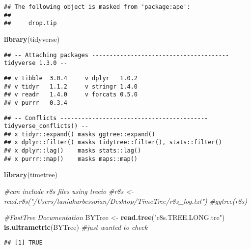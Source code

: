 \documentclass[
]{article}
\newenvironment{Shaded}{\begin{snugshade}}{\end{snugshade}}
\newcommand{\CommentTok}[1]{\textcolor[rgb]{0.56,0.35,0.01}{\textit{#1}}}
\newcommand{\KeywordTok}[1]{\textcolor[rgb]{0.13,0.29,0.53}{\textbf{#1}}}
\newcommand{\NormalTok}[1]{#1}
\newcommand{\StringTok}[1]{\textcolor[rgb]{0.31,0.60,0.02}{#1}}
\begin{document}
\begin{verbatim}
## The following object is masked from 'package:ape':
## 
##     drop.tip
\end{verbatim}

\begin{Shaded}
\begin{Highlighting}[]
\KeywordTok{library}\NormalTok{(tidyverse)}
\end{Highlighting}
\end{Shaded}

\begin{verbatim}
## -- Attaching packages --------------------------------------- tidyverse 1.3.0 --
\end{verbatim}

\begin{verbatim}
## v tibble  3.0.4     v dplyr   1.0.2
## v tidyr   1.1.2     v stringr 1.4.0
## v readr   1.4.0     v forcats 0.5.0
## v purrr   0.3.4
\end{verbatim}

\begin{verbatim}
## -- Conflicts ------------------------------------------ tidyverse_conflicts() --
## x tidyr::expand() masks ggtree::expand()
## x dplyr::filter() masks tidytree::filter(), stats::filter()
## x dplyr::lag()    masks stats::lag()
## x purrr::map()    masks maps::map()
\end{verbatim}

\begin{Shaded}
\begin{Highlighting}[]
\KeywordTok{library}\NormalTok{(timetree)}
\end{Highlighting}
\end{Shaded}

\begin{Shaded}
\begin{Highlighting}[]
\CommentTok{#can include r8s files using treeio}
\CommentTok{#r8s <- read.r8s("/Users/taniakurbessoian/Desktop/TimeTree/r8s_log.txt")}
\CommentTok{#ggtree(r8s)}

\CommentTok{#FastTree Documentation}
\NormalTok{BYTree <-}\StringTok{ }\KeywordTok{read.tree}\NormalTok{(}\StringTok{"r8s.TREE.LONG.tre"}\NormalTok{)}
\KeywordTok{is.ultrametric}\NormalTok{(BYTree) }\CommentTok{#just wanted to check}
\end{Highlighting}
\end{Shaded}

\begin{verbatim}
## [1] TRUE
\end{verbatim}
\end{document}
